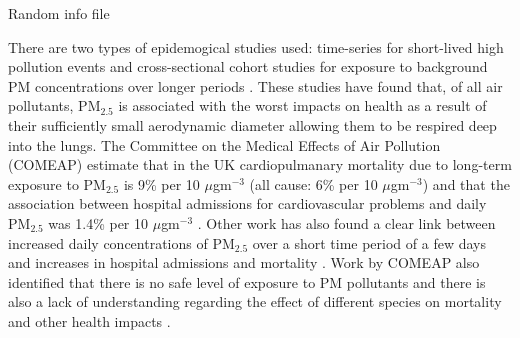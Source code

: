 Random info file 

There are two types of epidemogical studies used: time-series for short-lived high pollution events and cross-sectional cohort studies for exposure to background PM concentrations over longer periods \cite{Heal2012}. These studies have found that, of all air pollutants, PM$_{2.5}$ is associated with the worst impacts on health as a result of their sufficiently small aerodynamic diameter allowing them to be respired deep into the lungs. The Committee on the Medical Effects of Air Pollution (COMEAP) estimate that in the UK cardiopulmanary mortality due to long-term exposure to PM$_{2.5}$ is  9\% per 10 ${\mu}$gm$^{-3}$ (all cause: 6\% per 10 ${\mu}$gm$^{-3}$) and that the association between hospital admissions for cardiovascular problems and daily PM$_{2.5}$ was 1.4\% per 10 ${\mu}$gm$^{-3}$ \cite{Comeap}. Other work has also found a clear link between increased daily concentrations of PM$_{2.5}$ over a short time period of a few days and increases in hospital admissions and mortality \cite{Atkinson2015}. Work by COMEAP also identified that there is no safe level of exposure to PM pollutants and there is also a lack of understanding regarding the effect of different species on mortality and other health impacts \cite{Coemap}. \\